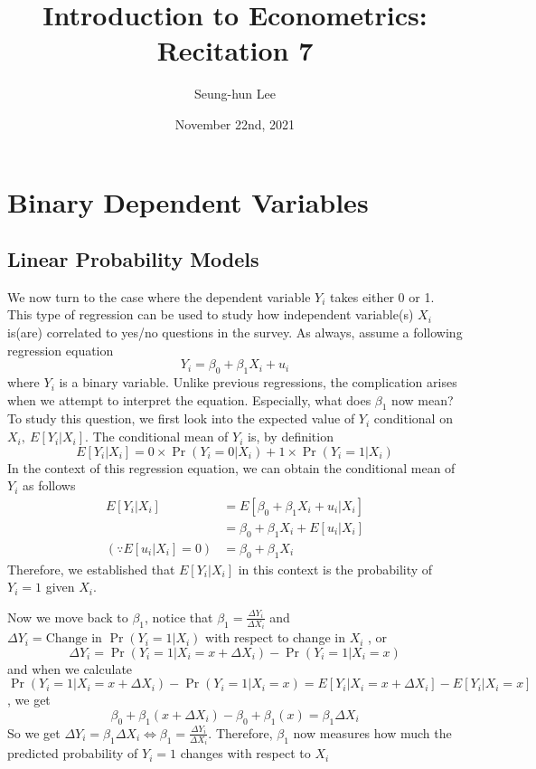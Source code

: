 \documentclass[12pt]{article}
\title{Introduction to Econometrics: Recitation 7}
\theoremstyle{definition}
\theoremstyle{property}
\theoremstyle{assumption}
\theoremstyle{example}
\theoremstyle{comment}
\begin{document}
\linespread{1.25}
\author{Seung-hun Lee}
\date{November 22nd, 2021 }
\maketitle

\section{Binary Dependent Variables}
\subsection{Linear Probability Models}
We now turn to the case where the dependent variable $Y_i$ takes either 0 or 1. This type of regression can be used to study how independent variable(s) $X_i$ is(are) correlated to yes/no questions in the survey. As always, assume a following regression equation
\[
Y_i = \beta_0 + \beta_1 X_i +u_i
\]
where $Y_i$ is a binary variable.  Unlike previous regressions, the complication arises when we attempt to interpret the equation. Especially, what does $\beta_1$ now mean? To study this question, we first look into the expected value of $Y_i$ conditional on $X_i,\ E[Y_i|X_i]$. The conditional mean of $Y_i$ is, by definition
\[
E[Y_i|X_i] = 0\times\Pr(Y_i=0|X_i)+1\times\Pr(Y_i=1|X_i)
\]
In the context of this regression equation, we can obtain the conditional mean of $Y_i$ as follows
\[
\begin{aligned}
E[Y_i|X_i]&=E[\beta_0+\beta_1X_i+u_i|X_i]\\
&=\beta_0 + \beta_1X_i + E[u_i|X_i]\\
(\because  E[u_i|X_i]=0)&=\beta_0 + \beta_1X_i 
\end{aligned}
\]
Therefore, we established that $E[Y_i|X_i]$ in this context is the probability of $Y_i=1$ given $X_i$. \par\medskip
Now we move back to $\beta_1$, notice that $\beta_1 =\frac{\Delta Y_i}{\Delta X_i}$ and $\Delta Y_i = \text{Change in }\Pr(Y_i=1|X_i)$ with respect to change in $X_i$ , or
\[
\Delta Y_i = \Pr(Y_i=1|X_i=x+\Delta X_i)-\Pr(Y_i=1|X_i=x)
\]
and when we calculate $\Pr(Y_i=1|X_i=x+\Delta X_i)-\Pr(Y_i=1|X_i=x)=E[Y_i|X_i=x+\Delta X_i]-E[Y_i|X_i=x]$, we get
\[
\beta_0+\beta_1(x+\Delta X_i)-\beta_0+\beta_1(x) =\beta_1 \Delta X_i
\]
So we get $\Delta Y_i = \beta_1\Delta X_i\iff\beta_1 =\frac{\Delta Y_i}{\Delta X_i}$. Therefore, $\beta_1$ now measures how much the predicted probability of $Y_i=1$ changes with respect to $X_i$ \par\medskip
\end{document}
